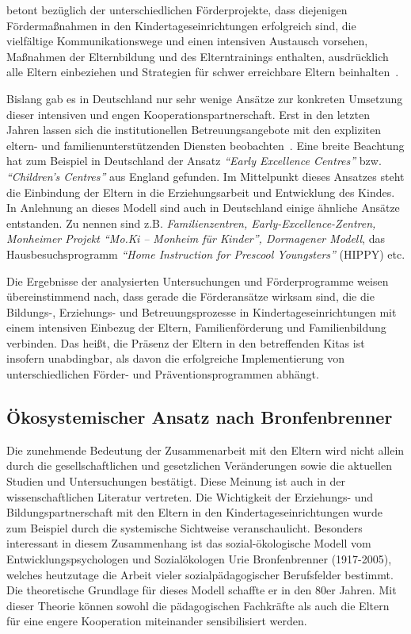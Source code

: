 \documentclass[12pt,a4paper]{article}
\begin{document}
\textcite{Sacher} betont bezüglich der unterschiedlichen Förderprojekte, dass diejenigen Fördermaßnahmen in den Kindertageseinrichtungen erfolgreich sind, die vielfältige Kommunikationswege und einen intensiven Austausch vorsehen, Maßnahmen der Elternbildung und des Elterntrainings enthalten, ausdrücklich alle Eltern einbeziehen und Strategien für schwer erreichbare Eltern beinhalten~\parencite[S.~240]{Sacher}.

	Bislang gab es in Deutschland nur sehr wenige Ansätze zur konkreten Umsetzung dieser intensiven und engen Kooperationspartnerschaft. Erst in den letzten Jahren lassen sich die institutionellen Betreuungsangebote mit den expliziten eltern- und familienunterstützenden Diensten beobachten~\parencite[S.~105-122]{Stoebe_2008}. Eine breite Beachtung hat zum Beispiel in Deutschland der Ansatz \textit{"`Early Excellence Centres"'} bzw. \textit{"`Children’s Centres"'} aus England gefunden. Im Mittelpunkt dieses Ansatzes steht die Einbindung der Eltern in die Erziehungsarbeit und Entwicklung des Kindes. In Anlehnung an dieses Modell sind auch in Deutschland einige ähnliche Ansätze entstanden. Zu nennen sind z.B. \textit{Familienzentren, Early-Excellence-Zentren, Monheimer Projekt "`Mo.Ki – Monheim für Kinder"', Dormagener Modell}, das Hausbesuchsprogramm  \textit{"`Home Instruction for Prescool Youngsters"'} (HIPPY) etc.
	
Die Ergebnisse der analysierten Untersuchungen und Förderprogramme weisen übereinstimmend nach, dass gerade die Förderansätze wirksam sind, die die Bildungs-, Erziehungs- und Betreuungsprozesse in Kindertageseinrichtungen mit einem intensiven Einbezug der Eltern, Familienförderung und Familienbildung verbinden. Das heißt, die Präsenz der Eltern in den betreffenden Kitas ist insofern unabdingbar, als davon die erfolgreiche Implementierung von unterschiedlichen Förder- und Präventionsprogrammen abhängt.


\subsection{Ökosystemischer Ansatz nach Bronfenbrenner} 

Die zunehmende Bedeutung der Zusammenarbeit mit den Eltern wird nicht allein durch die gesellschaftlichen und gesetzlichen Veränderungen sowie die aktuellen Studien und Untersuchungen bestätigt. Diese Meinung ist auch in der wissenschaftlichen Literatur vertreten. Die Wichtigkeit der Erziehungs- und Bildungspartnerschaft mit den Eltern in den Kindertageseinrichtungen wurde zum Beispiel durch die systemische Sichtweise veranschaulicht. Besonders interessant in diesem Zusammenhang ist das sozial-ökologische Modell vom Entwicklungspsychologen und Sozialökologen Urie Bronfenbrenner (1917-2005), welches heutzutage die Arbeit vieler sozialpädagogischer Berufsfelder bestimmt. Die theoretische Grundlage für dieses Modell schaffte er in den 80er Jahren. Mit dieser Theorie können sowohl die pädagogischen Fachkräfte als auch die Eltern für eine engere Kooperation miteinander sensibilisiert werden. 
\end{document}
